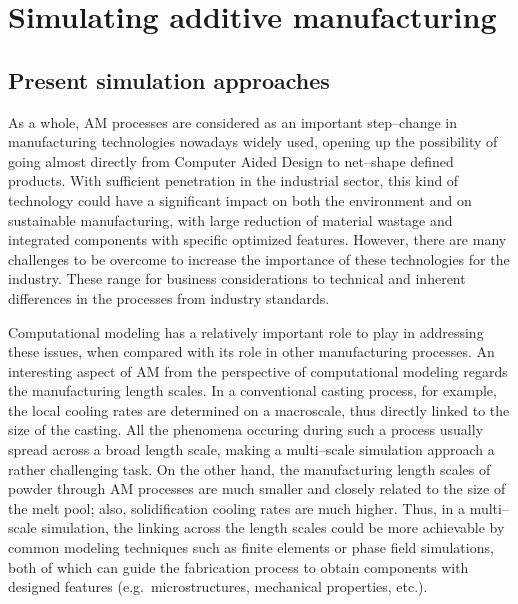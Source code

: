 \chapter{Simulating additive manufacturing}

\section{Present simulation approaches}
As a whole, AM processes are considered as an important step--change in manufacturing technologies nowadays widely used, opening up the possibility of going almost directly from Computer Aided Design to net--shape defined products. With sufficient penetration in the industrial sector, this kind of technology could have a significant impact on both the environment and on sustainable manufacturing, with large reduction of material wastage and integrated components with specific optimized features.
However, there are many challenges to be overcome to increase the importance of these technologies for the industry. These range for business considerations to technical and inherent differences in the processes from industry standards.

Computational modeling has a relatively important role to play in addressing these issues, when compared with its role in other manufacturing processes. An interesting aspect of AM from the perspective of computational modeling regards the manufacturing length scales. In a conventional casting process, for example, the local cooling rates are determined on a macroscale, thus directly linked to the size of the casting. All the phenomena occuring during such a process usually spread across a broad length scale, making a multi--scale simulation approach a rather challenging task.
On the other hand, the manufacturing length scales of powder through AM processes are much smaller and closely related to the size of the melt pool; also, solidification cooling rates are much higher. Thus, in a multi--scale simulation, the linking across the length scales could be more achievable by common modeling techniques such as finite elements or phase field simulations, both of which can guide the fabrication process to obtain components with designed features (e.g.\ microstructures, mechanical properties, etc.).

